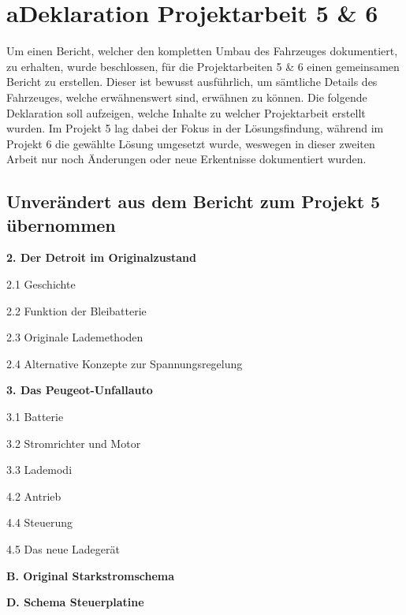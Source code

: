 \chapter*{a\quad Deklaration Projektarbeit 5 \& 6}\color{blue}
Um einen Bericht, welcher den kompletten Umbau des Fahrzeuges dokumentiert, zu erhalten, wurde beschlossen, für die Projektarbeiten 5 \& 6 einen gemeinsamen Bericht zu erstellen. Dieser ist bewusst ausführlich, um sämtliche Details des Fahrzeuges, welche erwähnenswert sind, erwähnen zu können. Die folgende Deklaration soll aufzeigen, welche Inhalte zu welcher Projektarbeit erstellt wurden. Im Projekt 5 lag dabei der Fokus in der Lösungsfindung, während im Projekt 6 die gewählte Lösung umgesetzt wurde, weswegen in dieser zweiten Arbeit nur noch Änderungen oder neue Erkentnisse dokumentiert wurden.

\section*{Unverändert aus dem Bericht zum Projekt 5 übernommen}
\begin{compactitem}
\item \textbf{2. Der Detroit im Originalzustand}
\item 2.1 Geschichte
\item 2.2 Funktion der Bleibatterie
\item 2.3 Originale Lademethoden
\item 2.4 Alternative Konzepte zur Spannungsregelung
\item \textbf{3. Das Peugeot-Unfallauto}
\item 3.1 Batterie
\item 3.2 Stromrichter und Motor
\item 3.3 Lademodi
\item 4.2 Antrieb
\item 4.4 Steuerung
\item 4.5 Das neue Ladegerät
\item \textbf{B. Original Starkstromschema}
\item \textbf{D. Schema Steuerplatine}
\end{compactitem}

